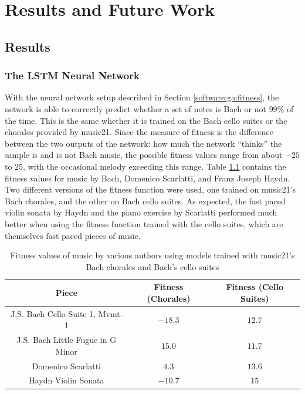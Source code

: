 \chapter{Results and Future Work} \label{results_future}

\section{Results} \label{results}

\subsection{The LSTM Neural Network}

With the neural network setup described in Section \ref{software:ga:fitness}, the network is able to correctly predict whether a set of notes is Bach or not $99\%$ of the time.
This is the same whether it is trained on the Bach cello suites or the chorales provided by music21.
Since the measure of fitness is the difference between the two outputs of the network: how much the network ``thinks'' the sample is and is not Bach music, the possible fitness values range from about $-25$ to $25$, with the occasional melody exceeding this range.
Table \ref{table:fitnesscomp} contains the fitness values for music by Bach, Domenico Scarlatti, and Franz Joseph Haydn.
Two different versions of the fitness function were used, one trained on music21's Bach chorales, and the other on Bach cello suites.
As expected, the fast paced violin sonata by Haydn and the piano exercise by Scarlatti performed much better when using the fitness function trained with the cello suites, which are themselves fast paced pieces of music.


\begin{table}
	\centering
	\begin{tabular}{c | c c}
		Piece & Fitness (Chorales) & Fitness (Cello Suites) \\
		\hline
		J.S. Bach Cello Suite 1, Mvmt. 1 & $-18.3$ & $12.7$ \\
		J.S. Bach Little Fugue in G Minor & $15.0$ & $11.7$ \\
		Domenico Scarlatti & $4.3$ & $13.6$ \\
		Haydn Violin Sonata & $-10.7$ & $15$
	\end{tabular}
	\caption{Fitness values of music by various authors using models trained with music21's Bach chorales and Bach's cello suites}
	\label{table:fitnesscomp}
\end{table}

